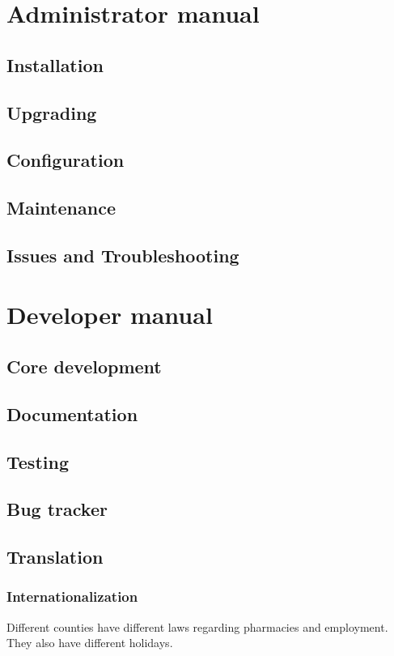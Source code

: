 \documentclass[12pt,a4paper,titlepage]{book}
\begin{document}
\chapter{Administrator manual}
\section{Installation}
\section{Upgrading}
\section{Configuration}
\section{Maintenance}
\section{Issues and Troubleshooting}


\chapter{Developer manual}
\section{Core development}
\section{Documentation}
\section{Testing}
\section{Bug tracker}
\section{Translation}
\subsection{Internationalization}
Different counties have different laws regarding pharmacies and employment. They also have different holidays.
\end{document}
